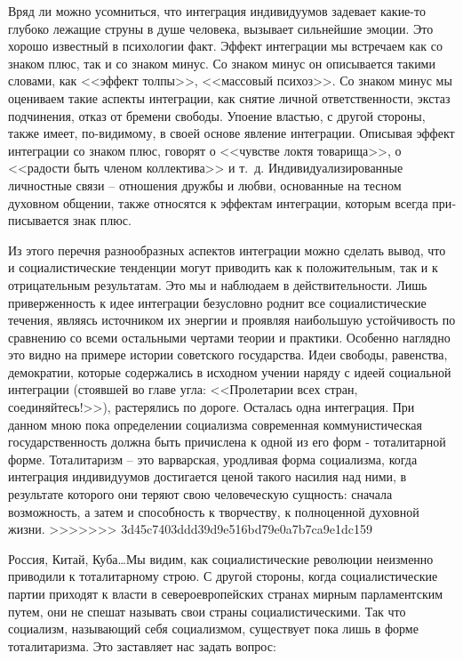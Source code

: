 \documentclass{book}
\begin{document}
Вряд ли можно усомниться, что интеграция индивидуумов задевает какие-то глубоко лежащие струны в душе человека, вызывает сильнейшие эмоции. Это хорошо известный в психо­логии факт. Эффект интеграции мы встречаем как со знаком плюс, так и со знаком минус. Со знаком минус он описывает­ся такими словами, как <<эффект толпы>>, <<массовый психоз>>. Со знаком минус мы оцениваем такие аспекты интеграции, как снятие личной ответственности, экстаз подчинения, отказ от бремени свободы. Упоение властью, с другой стороны, также имеет, по-видимому, в своей основе явление интеграции. Опи­сывая эффект интеграции со знаком плюс, говорят о <<чувст­ве локтя товарища>>, о <<радости быть членом коллектива>> и т.~д. Индивидуализированные личностные связи -- отношения дружбы и любви, основанные на тесном духовном общении, также относятся к эффектам интеграции, которым всегда при­писывается знак плюс.

Из этого перечня разнообразных аспектов интеграции можно сделать вывод, что и социалистические тенденции могут при­водить как к положительным, так и к отрицательным резуль­татам. Это мы и наблюдаем в действительности. Лишь привер­женность к идее интеграции безусловно роднит все социали­стические течения, являясь источником их энергии и проявляя наибольшую устойчивость по сравнению со всеми остальными чертами теории и практики. Особенно наглядно это видно на примере истории советского государства. Идеи свободы, ра­венства, демократии, которые содержались в исходном учении наряду с идеей социальной интеграции (стоявшей во главе угла: <<Пролетарии всех стран, соединяйтесь!>>), растерялись по доро­ге. Осталась одна интеграция. При данном мною пока опреде­лении социализма современная коммунистическая государст­венность должна быть причислена к одной из его форм - тота­литарной форме. Тоталитаризм -- это варварская, уродливая форма социализма, когда интеграция индивидуумов достига­ется ценой такого насилия над ними, 
в результате которого они теряют свою человеческую сущность: сначала возможность, а затем и способность к творчеству, к полноценной духовной жизни.
>>>>>>> 3d45c7403ddd39d9e516bd79e0a7b7ca9e1dc159

Россия, Китай, Куба\ldots Мы видим, как социалистические ре­волюции неизменно приводили к тоталитарному строю. С дру­гой стороны, когда социалистические партии приходят к власти в североевропейских странах мирным парламентским путем, они не спешат называть свои страны социалистическими. Так что социализм, называющий себя социализмом, существует пока лишь в форме тоталитаризма. Это заставляет нас задать вопрос:
\end{document}
